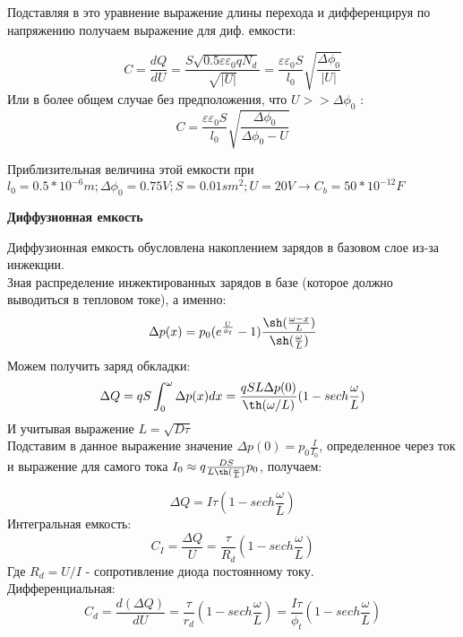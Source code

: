 Подставляя в это уравнение выражение длины перехода и дифференцируя по напряжению получаем выражение для диф. емкости:

\begin{equation}
C = \frac{dQ}{dU} = \frac{S \sqrt{0.5 \varepsilon \varepsilon_0 q N_d}}{\sqrt{|U|}} = \frac{ \varepsilon \varepsilon_0 S}{l_0} \sqrt{\frac{\Delta \phi_0}{|U|}}
\end{equation}
Или в более общем случае без предположения, что $U >> \Delta \phi_0$ :
\begin{equation}
C = \frac{ \varepsilon \varepsilon_0 S}{l_0} \sqrt{\frac{\Delta \phi_0}{\Delta \phi_0 - U}}
\end{equation}

Приблизительная величина этой емкости при $l_0 = 0.5 * 10^{-6} m; \Delta \phi_0 = 0.75 V; S = 0.01 sm^2; U = 20 V  \longrightarrow C_b = 50*10^{-12} F$



\textbf{Диффузионная емкость}


Диффузионная емкость обусловлена накоплением зарядов в базовом слое из-за инжекции.\\
Зная распределение инжектированных зарядов в базе (которое должно выводиться в тепловом токе), а именно:
\begin{equation}
\Delta p (x) = p_0 (e^{\frac{U}{\phi_t}}-1) \frac{\sh(\frac{\omega - x}{L})}{\sh(\frac{\omega}{L})}
\end{equation}
Можем получить заряд обкладки:
\begin{equation}
\Delta Q = q S \int_{0}^{\omega} \Delta p(x) dx = \frac{q S L \Delta p (0)}{\th(\omega / L)}(1 - sech \frac{\omega}{L})
\end{equation}
И учитывая выражение $L = \sqrt{D \tau}$\\
Подставим в данное выражение значение $\Delta p (0) = p_0 \frac{I}{I_0}$, определенное через ток и выражение для самого тока $I_0 \approx q \frac{DS}{L \th(\frac{\omega}{L})} p_0$, получаем:

\begin{equation}
\Delta Q = I \tau (1 - sech \frac{\omega}{L})
\end{equation}
Интегральная емкость:
\begin{equation}
C_I = \frac{\Delta Q}{U} = \frac{\tau}{R_d}  (1 - sech \frac{\omega}{L})
\end{equation}
Где $R_d = U/I$ - сопротивление диода постоянному току.\\
Дифференциальная:
\begin{equation}
C_d = \frac{d (\Delta Q)}{dU} =  \frac{\tau}{r_d}  (1 - sech \frac{\omega}{L}) =  \frac{ I \tau}{\phi_t}  (1 - sech \frac{\omega}{L})
\end{equation}

